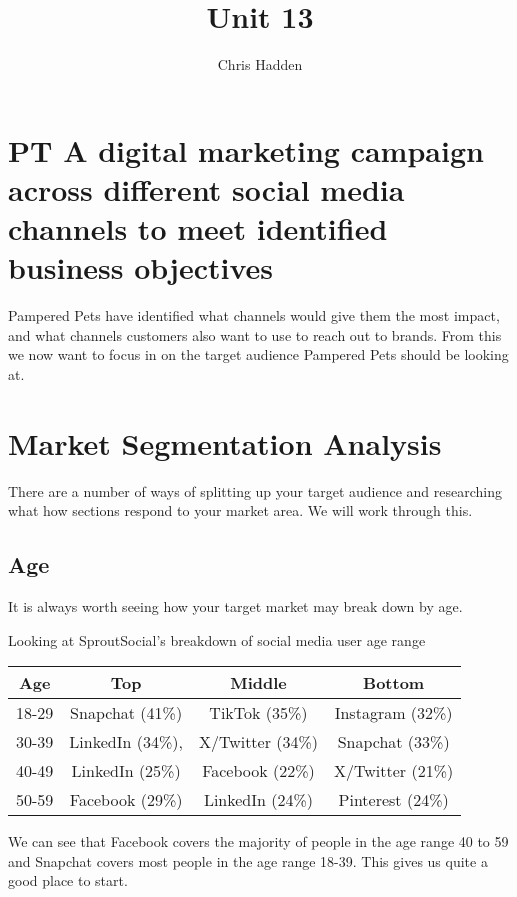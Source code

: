 \documentclass{article}
\begin{document}
\title{Unit 13}
\author{Chris Hadden}
\date{}
\maketitle

\section{PT A digital marketing campaign across different social media channels to meet identified business objectives}
Pampered Pets have identified what channels would give them the most impact, and what channels customers also want to use to reach out to brands. From this we now want to focus in on the target audience Pampered Pets should be looking at.

\section{Market Segmentation Analysis}
There are a number of ways of splitting up your target audience and researching what how sections respond to your market area. We will work through this.

\subsection{Age}
It is always worth seeing how your target market may break down by age. 

Looking at SproutSocial's breakdown of social media user age range \cite{sproutage}
\begin{center}
    \begin{tabular}{||c c c c||} 
     \hline
     Age & Top & Middle & Bottom \\ [0.5ex] 
     \hline\hline
     18-29 & Snapchat (41\%) & TikTok (35\%) & Instagram (32\%) \\ 
     \hline
     30-39 & LinkedIn (34\%), & X/Twitter (34\%) & Snapchat (33\%) \\
     \hline
     40-49 & LinkedIn (25\%) & Facebook (22\%) & X/Twitter (21\%) \\
     \hline
     50-59 & Facebook (29\%) & LinkedIn (24\%) & Pinterest (24\%) \\
     \hline
    \end{tabular}
    \label {Age ranges of social media}
    \end{center}

We can see that Facebook covers the majority of people in the age range 40 to 59 and Snapchat covers most people in the age range 18-39. This gives us quite a good place to start.
\end{document}
